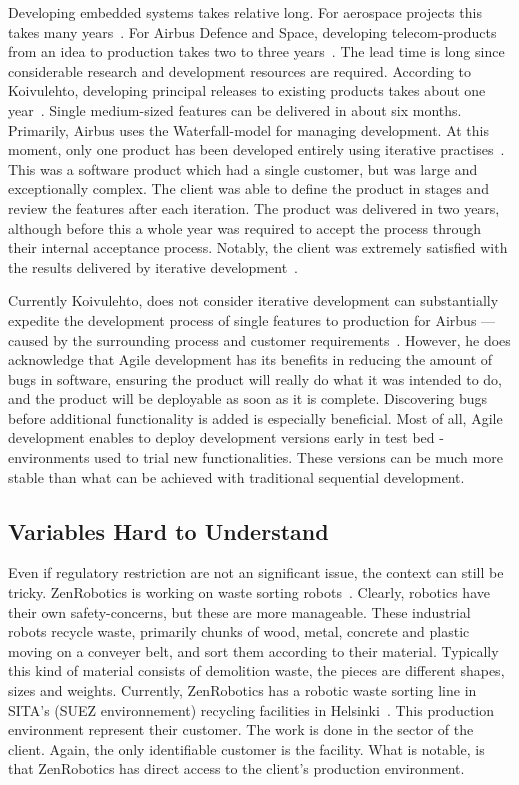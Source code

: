 \documentclass[english]{tktltiki2}
\begin{document}
Developing embedded systems takes relative long. For aerospace projects this takes many years~\cite{Hol15b}. For Airbus Defence and Space, developing telecom-products from an idea to production takes two to three years~\cite{Koi15}. The lead time is long since considerable research and development resources are required. According to Koivulehto, developing principal releases to existing products takes about one year~\cite{Koi15}. Single medium-sized features can be delivered in about six months. Primarily, Airbus uses the Waterfall-model for managing development. At this moment, only one product has been developed entirely using iterative practises~\cite{Koi15}. This was a software product which had a single customer, but was large and exceptionally complex. The client was able to define the product in stages and review the features after each iteration. The product was delivered in two years, although before this a whole year was required to accept the process through their internal acceptance process. Notably, the client was extremely satisfied with the results delivered by iterative development~\cite{Koi15}.

Currently Koivulehto, does not consider iterative development can substantially expedite the development process of single features to production for Airbus — caused by the surrounding process and customer requirements~\cite{Koi15}. However, he does acknowledge that Agile development has its benefits in reducing the amount of bugs in software, ensuring the product will really do what it was intended to do, and the product will be deployable as soon as it is complete. Discovering bugs before additional functionality is added is especially beneficial. Most of all, Agile development enables to deploy development versions early in test bed -environments used to trial new functionalities. These versions can be much more stable than what can be achieved with traditional sequential development.

\subsection{Variables Hard to Understand}

Even if regulatory restriction are not an significant issue, the context can still be tricky. ZenRobotics is working on waste sorting robots~\cite{Hol15a}. Clearly, robotics have their own safety-concerns, but these are more manageable. These industrial robots recycle waste, primarily chunks of wood, metal, concrete and plastic moving on a conveyer belt, and sort them according to their material. Typically this kind of material consists of demolition waste, the pieces are different shapes, sizes and weights. Currently, ZenRobotics has a robotic waste sorting line in SITA’s (SUEZ environnement) recycling facilities in Helsinki~\cite{Hol15a, SITA}. This production environment represent their customer. The work is done in the sector of the client. Again, the only identifiable customer is the facility. What is notable, is that ZenRobotics has direct access to the client’s production environment.
\end{document}
